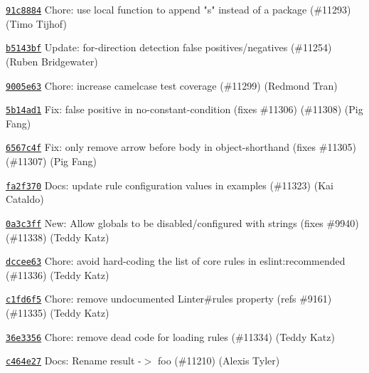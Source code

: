 \begin{DoxyItemize}
\item \href{https://github.com/eslint/eslint/commit/91c8884971f5e57f5f7490d8daf92c4a9a489836}{\texttt{ {\ttfamily 91c8884}}} Chore\+: use local function to append "{}s"{} instead of a package (\#11293) (Timo Tijhof)
\item \href{https://github.com/eslint/eslint/commit/b5143bfc09e53d8da8f63421ade093b7593f4f51}{\texttt{ {\ttfamily b5143bf}}} Update\+: for-\/direction detection false positives/negatives (\#11254) (Ruben Bridgewater)
\item \href{https://github.com/eslint/eslint/commit/9005e632d13476880c55f7e3c8a6e450762a5171}{\texttt{ {\ttfamily 9005e63}}} Chore\+: increase camelcase test coverage (\#11299) (Redmond Tran)
\item \href{https://github.com/eslint/eslint/commit/5b14ad1003c7df9a37621dea55c6d6d0484adc05}{\texttt{ {\ttfamily 5b14ad1}}} Fix\+: false positive in no-\/constant-\/condition (fixes \#11306) (\#11308) (Pig Fang)
\item \href{https://github.com/eslint/eslint/commit/6567c4f6665df85c3347388b29d8193cc8208d63}{\texttt{ {\ttfamily 6567c4f}}} Fix\+: only remove arrow before body in object-\/shorthand (fixes \#11305) (\#11307) (Pig Fang)
\item \href{https://github.com/eslint/eslint/commit/fa2f370affa4814dbdda278f9859d0172d4b7aa2}{\texttt{ {\ttfamily fa2f370}}} Docs\+: update rule configuration values in examples (\#11323) (Kai Cataldo)
\item \href{https://github.com/eslint/eslint/commit/0a3c3ff1d91e8f39943efc4a7d2bf6927d68d37e}{\texttt{ {\ttfamily 0a3c3ff}}} New\+: Allow globals to be disabled/configured with strings (fixes \#9940) (\#11338) (Teddy Katz)
\item \href{https://github.com/eslint/eslint/commit/dccee63cf41234180c71bf0fe01b165c9078fc69}{\texttt{ {\ttfamily dccee63}}} Chore\+: avoid hard-\/coding the list of core rules in eslint\+:recommended (\#11336) (Teddy Katz)
\item \href{https://github.com/eslint/eslint/commit/c1fd6f54d92efe615bcae529006221e122dbe9e6}{\texttt{ {\ttfamily c1fd6f5}}} Chore\+: remove undocumented {\ttfamily Linter\#rules} property (refs \#9161) (\#11335) (Teddy Katz)
\item \href{https://github.com/eslint/eslint/commit/36e335681d61cbe3c83b653b7cc5f95730f1d86e}{\texttt{ {\ttfamily 36e3356}}} Chore\+: remove dead code for loading rules (\#11334) (Teddy Katz)
\item \href{https://github.com/eslint/eslint/commit/c464e2744ec76e7e9c6c5af0f6162c92187f1ece}{\texttt{ {\ttfamily c464e27}}} Docs\+: Rename {\ttfamily result} -\/\texorpdfstring{$>$}{>} {\ttfamily foo} (\#11210) (Alexis Tyler)
\end{DoxyItemize}

